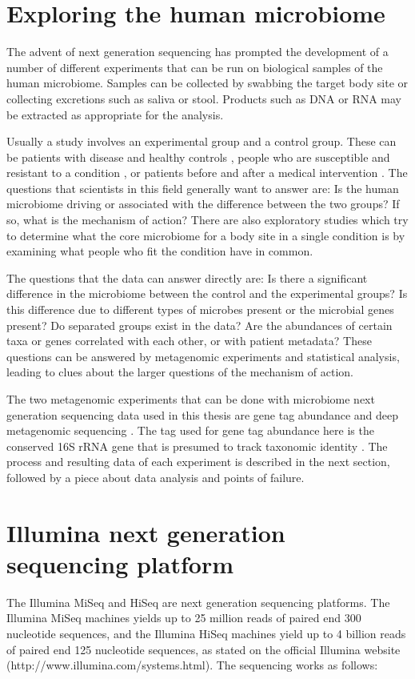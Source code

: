 \section{Exploring the human microbiome}
The advent of next generation sequencing has prompted the development of a number of different experiments that can be run on biological samples of the human microbiome. Samples can be collected by swabbing the target body site or collecting excretions such as saliva or stool. Products such as DNA or RNA may be extracted as appropriate for the analysis.

Usually a study involves an experimental group and a control group. These can be patients with disease and healthy controls \cite{macklaim2013comparative}, people who are susceptible and resistant to a condition \cite{theriot2014antibiotic}, or patients before and after a medical intervention \cite{graessler2013metagenomic}. The questions that scientists in this field generally want to answer are: Is the human microbiome driving or associated with the difference between the two groups? If so, what is the mechanism of action? There are also exploratory studies which try to determine what the core microbiome for a body site in a single condition is by examining what people who fit the condition have in common.

The questions that the data can answer directly are: Is there a significant difference in the microbiome between the control and the experimental groups? Is this difference due to different types of microbes present or the microbial genes present? Do separated groups exist in the data? Are the abundances of certain taxa or genes correlated with each other, or with patient metadata? These questions can be answered by metagenomic experiments and statistical analysis, leading to clues about the larger questions of the mechanism of action.

The two metagenomic experiments that can be done with microbiome next generation sequencing data used in this thesis are gene tag abundance and deep metagenomic sequencing \cite{riesenfeld2004metagenomics}. The tag used for gene tag abundance here is the conserved 16S rRNA gene that is presumed to track taxonomic identity \cite{gloor2010microbiome}. The process and resulting data of each experiment is described in the next section, followed by a piece about data analysis and points of failure.

\section{Illumina next generation sequencing platform}
The Illumina MiSeq and HiSeq are next generation sequencing platforms. The Illumina MiSeq machines yields up to 25 million reads of paired end 300 nucleotide sequences, and the Illumina HiSeq machines yield up to 4 billion reads of paired end 125 nucleotide sequences, as stated on the official Illumina website (http://www.illumina.com/systems.html). The sequencing works as follows:

